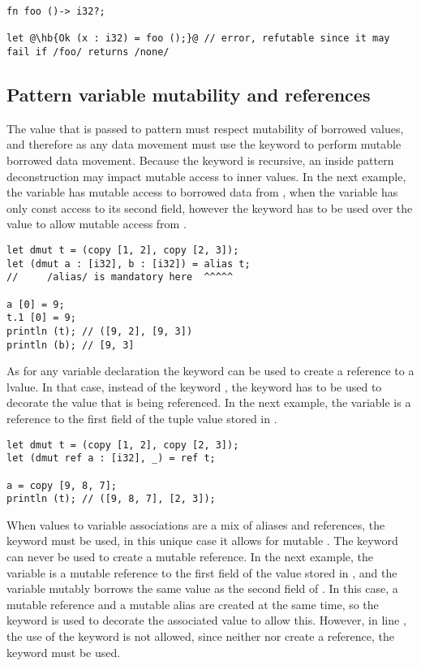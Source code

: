 \begin{lstlisting}[style=coloredverbatim, escapechar=@]
fn foo ()-> i32?;

let @\hb{Ok (x : i32) = foo ();}@ // error, refutable since it may fail if /foo/ returns /none/
\end{lstlisting}

\subsection{Pattern variable mutability and references}

The value that is passed to pattern must respect mutability of borrowed values,
and therefore as any data movement must use the keyword  to
perform mutable borrowed data movement. Because the keyword is recursive, an
inside pattern deconstruction may impact mutable access to inner values. In the
next example, the variable  has mutable access to borrowed data from
, when the variable  has only const access to its second
field, however the keyword  has to be used over the value
 to allow mutable access from .

\begin{lstlisting}[style=coloredverbatim, escapechar=@]
let dmut t = (copy [1, 2], copy [2, 3]);
let (dmut a : [i32], b : [i32]) = alias t;
//     /alias/ is mandatory here  ^^^^^

a [0] = 9;
t.1 [0] = 9;
println (t); // ([9, 2], [9, 3])
println (b); // [9, 3]
\end{lstlisting}

As for any variable declaration the keyword  can be used to create a
reference to a lvalue. In that case, instead of the keyword \token{alias}, the
keyword \token{ref} has to be used to decorate the value that is being
referenced. In the next example, the variable \token{a} is a reference to the
first field of the tuple value stored in \token{t}.

\begin{lstlisting}[style=coloredverbatim, escapechar=@]
let dmut t = (copy [1, 2], copy [2, 3]);
let (dmut ref a : [i32], _) = ref t;

a = copy [9, 8, 7];
println (t); // ([9, 8, 7], [2, 3]);
\end{lstlisting}

When values to variable associations are a mix of aliases and references, the
keyword \token{ref} must be used, in this unique case it allows for mutable
. The \token{alias} keyword can never be used to create a mutable
reference. In the next example, the variable \token{a} is a mutable reference
to the first field of the value stored in , and the variable
\token{b} mutably borrows the same value as the second field of \token{t}. In
this case, a mutable reference and a mutable alias are created at the same time,
so the keyword  is used to decorate the associated value to allow
this. However, in line \token{4}, the use of the keyword \token{ref} is not
allowed, since neither \token{c} nor \token{d} create a reference, the keyword
\token{alias} must be used.


